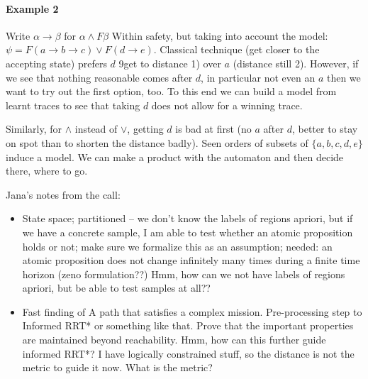 \documentclass{article}
\newcommand{\jana}[1]{{\color{magenta} #1}}
\begin{document}
\paragraph{Example 2}
Write $\alpha\to\beta$ for $\alpha\wedge F\beta$
Within safety, but taking into account the model: $\psi=F(a\to b\to c)\vee F(d\to e)$.
Classical technique (get closer to the accepting state) prefers $d$ 9get to distance 1) over $a$ (distance still 2). 
However, if we see that nothing reasonable comes after $d$, in particular not even an $a$ then we want to try out the first option, too.
To this end we can build a model from learnt traces to see that taking $d$ does not allow for a winning trace.

Similarly, for $\wedge$ instead of $\vee$, getting $d$ is bad at first (no $a$ after $d$, better to stay on spot than to shorten the distance badly).
Seen orders of subsets of $\{a,b,c,d,e\}$ induce a model.
We can make a product with the automaton and then decide there, where to go.

Jana's notes from the call: 
\begin{itemize}
\item State space; partitioned -- we don't know the labels of regions apriori, but if we have a concrete sample, I am able to test whether an atomic proposition holds or not; make sure we formalize this as an assumption; needed: an atomic proposition does not change infinitely many times during a finite time horizon (zeno formulation??)
\jana{Hmm, how can we not have labels of regions apriori, but be able to test samples at all??}
\item Fast finding of A path that satisfies a complex mission. Pre-processing step to Informed RRT* or something like that. Prove that the important properties are maintained beyond reachability.
\jana{Hmm, how can this further guide informed RRT*? I have logically constrained stuff, so the distance is not the metric to guide it now. What is the metric?}
\end{itemize}


\newcommand{\must}{\Rightarrow}
\newcommand{\may}{\rightarrow}
\newcommand{\maynot}{\nrightarrow}
\newcommand{\mustnot}{\nRightarrow}
\end{document}
